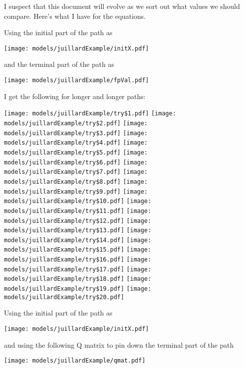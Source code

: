 \documentclass[12pt]{article}
\begin{document}
I suspect that 
this document will evolve as we sort out what values we should compare.
Here's what I have for the equations.

  

Using the initial part of the path as

\texttt{[image: models/juillardExample/initX.pdf]}

and the terminal part of the path as


\texttt{[image: models/juillardExample/fpVal.pdf]}

I get the following for longer and longer paths:

\texttt{[image: models/juillardExample/try\$1.pdf]}
\texttt{[image: models/juillardExample/try\$2.pdf]}
\texttt{[image: models/juillardExample/try\$3.pdf]}
\texttt{[image: models/juillardExample/try\$4.pdf]}
\texttt{[image: models/juillardExample/try\$5.pdf]}
\texttt{[image: models/juillardExample/try\$6.pdf]}
\texttt{[image: models/juillardExample/try\$7.pdf]}
\texttt{[image: models/juillardExample/try\$8.pdf]}
\texttt{[image: models/juillardExample/try\$9.pdf]}
\texttt{[image: models/juillardExample/try\$10.pdf]}
\texttt{[image: models/juillardExample/try\$11.pdf]}
\texttt{[image: models/juillardExample/try\$12.pdf]}
\texttt{[image: models/juillardExample/try\$13.pdf]}
\texttt{[image: models/juillardExample/try\$14.pdf]}
\texttt{[image: models/juillardExample/try\$15.pdf]}
\texttt{[image: models/juillardExample/try\$16.pdf]}
\texttt{[image: models/juillardExample/try\$17.pdf]}
\texttt{[image: models/juillardExample/try\$18.pdf]}
\texttt{[image: models/juillardExample/try\$19.pdf]}
\texttt{[image: models/juillardExample/try\$20.pdf]}


Using the initial part of the path as


\texttt{[image: models/juillardExample/initX.pdf]}

and using the following Q matrix to pin down the terminal part of the path 

\texttt{[image: models/juillardExample/qmat.pdf]}
\end{document}
